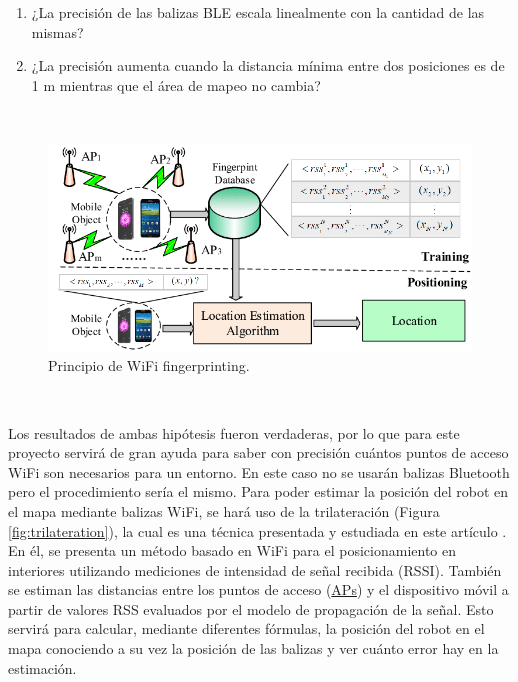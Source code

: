 \begin{enumerate}
 \item ¿La precisión de las balizas BLE escala linealmente con la cantidad de las mismas?
 \item ¿La precisión aumenta
cuando la distancia mínima entre dos posiciones es de 1 m mientras que el área de mapeo no cambia?
\end{enumerate}\ 

\begin{figure} [H]
  \begin{center}
    \includegraphics[scale=0.6]{figs/wifi}
  \end{center}
  \caption{Principio de WiFi fingerprinting.}
  \label{fig:wifi}
\end{figure}\

Los resultados de ambas hipótesis fueron verdaderas, por lo que para este proyecto servirá de gran ayuda para saber con precisión cuántos puntos de acceso WiFi son necesarios para un entorno. En este caso no se usarán balizas Bluetooth pero el procedimiento sería el mismo. Para poder estimar la posición del robot en el mapa mediante balizas WiFi, se hará uso de la trilateración (Figura \ref{fig:trilateration}), la cual es una técnica presentada y estudiada en este artículo \cite{inproceedings}. En él, se presenta un método basado en WiFi para el posicionamiento en interiores utilizando mediciones de intensidad de señal recibida (RSSI). También se estiman las distancias entre los puntos de acceso (\hyperlink{APs}{APs}) y el dispositivo móvil a partir de valores RSS evaluados por el modelo de propagación de la señal. Esto servirá para calcular, mediante diferentes fórmulas, la posición del robot en el mapa conociendo a su vez la posición de las balizas y ver cuánto error hay en la estimación.\\


